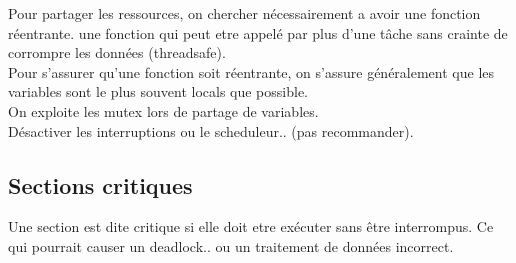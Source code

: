 \documentclass[oneside]{book}
\begin{document}
    Pour partager les ressources, on chercher nécessairement a avoir une fonction réentrante. une fonction qui peut etre appelé par plus d'une tâche sans crainte de corrompre les données (threadsafe).\\
    
    Pour s'assurer qu'une fonction soit réentrante, on s'assure généralement que les variables sont le plus souvent locals que possible.\\
    
    On exploite les mutex lors de partage de variables.\\
    
    Désactiver les interruptions ou le scheduleur.. (pas recommander).\\
    
    \subsection{Sections critiques}
    Une section est dite critique si elle doit etre exécuter sans être interrompus. Ce qui pourrait causer un deadlock.. ou un traitement de données incorrect.
    
\end{document}
